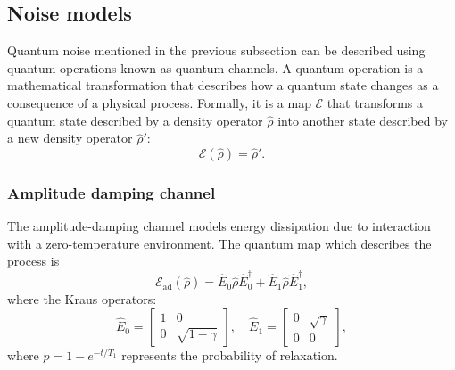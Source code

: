 \subsection{Noise models}
Quantum noise mentioned in the previous subsection can be described using quantum operations known as quantum channels. 
A quantum operation is a mathematical transformation that describes how a quantum state changes as a consequence of a physical process. 
Formally, it is a map $\mathcal{E}$ that transforms a quantum state described by a density operator $\hat{\rho}$ into another state described by a new density operator $\hat{\rho}'$:
\begin{equation}
    \mathcal{E}(\hat{\rho}) = \hat{\rho}'\label{eq:quantum_map}.
\end{equation}

\subsubsection{Amplitude damping channel}
The amplitude-damping channel models energy dissipation due to interaction with a zero-temperature environment. The quantum map which describes the process is 
\begin{equation}\label{eq:amplitude_damping}
    \mathcal{E}_{\text{ad}}(\hat{\rho}) = \hat{E}_0 \hat{\rho} \hat{E}_0^{\dagger} + \hat{E}_1 \hat{\rho} \hat{E}_1^{\dagger},
\end{equation}
where the Kraus operators:
\begin{equation}
    \hat{E}_0 = \begin{bmatrix} 1 & 0 \\ 0 & \sqrt{1 - \gamma} \end{bmatrix}, \quad
    \hat{E}_1 = \begin{bmatrix} 0 & \sqrt{\gamma} \\ 0 & 0 \end{bmatrix},
\end{equation}
where $p = 1 - e^{-t/T_1}$ represents the probability of relaxation.

